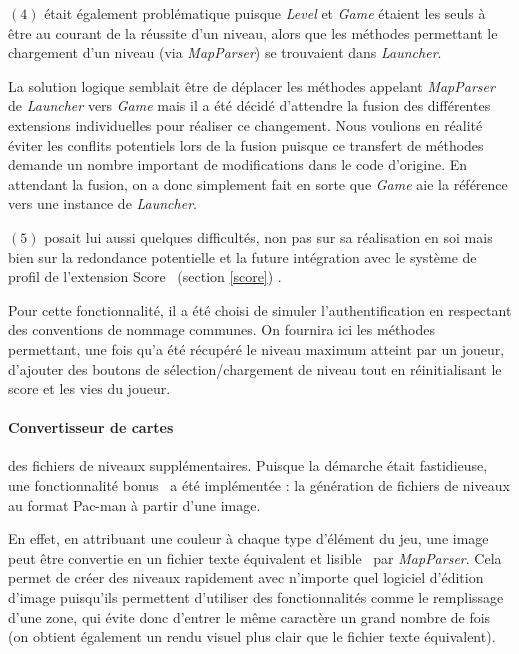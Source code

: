 \documentclass[12pt, openany]{report}
\begin{document}
$(4)$ était également problématique puisque \mbox{\textit{Level}} et \mbox{\textit{Game}} étaient les seuls à être au courant de la réussite d'un niveau, alors que les méthodes permettant le chargement d'un niveau (via \mbox{\textit{MapParser}}) se trouvaient dans \mbox{\textit{Launcher}}. 

La solution logique semblait être de déplacer les méthodes appelant \mbox{\textit{MapParser}} de \mbox{\textit{Launcher}} vers \mbox{\textit{Game}} mais il a été décidé d'attendre la fusion des différentes extensions individuelles pour réaliser ce changement. Nous voulions en réalité éviter les conflits potentiels lors de la fusion puisque ce \og transfert \fg de méthodes demande un nombre important de modifications dans le code d'origine. En attendant la fusion, on a donc simplement fait en sorte que \mbox{\textit{Game}} aie la référence vers une instance de \mbox{\textit{Launcher}}.

$(5)$ posait lui aussi quelques difficultés, non pas sur sa réalisation en soi mais bien sur la redondance potentielle et la future intégration avec le système de profil de l'extension \og Score \fg \, (section \ref{score}) . 

Pour cette fonctionnalité, il a été choisi de simuler l'authentification en respectant des conventions de nommage communes. On fournira ici les méthodes permettant, une fois qu'a été récupéré le niveau maximum atteint par un joueur, d'ajouter des boutons de sélection/chargement de niveau tout en réinitialisant le score et les vies du joueur.

\paragraph{Convertisseur de cartes} \label{map_generator_txt}
 des fichiers de niveaux supplémentaires. Puisque la démarche était fastidieuse, une fonctionnalité \og bonus \fg \, a été implémentée : la génération de fichiers de niveaux au format Pac-man à partir d'une image. \label{map_generator_txt}

En effet, en attribuant une couleur à chaque type d'élément du jeu,  une image peut être convertie en un fichier texte équivalent et \og lisible \fg \, par \mbox{\textit{MapParser}}. Cela permet de créer des niveaux rapidement avec n'importe quel logiciel d'édition d'image puisqu'ils permettent d'utiliser des fonctionnalités comme le \og remplissage \fg d'une zone, qui évite donc d'entrer le même caractère un grand nombre de fois (on obtient également un rendu visuel plus clair que le fichier texte équivalent). 
\end{document}
